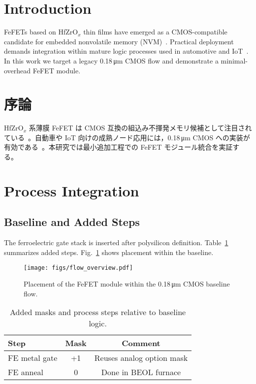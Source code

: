 \documentclass[journal]{IEEEtran}
\begin{document}
\section{Introduction}
FeFETs based on HfZrO$_x$ thin films have emerged as a CMOS-compatible candidate for embedded nonvolatile memory (NVM)~\citep{boscke2011hafnium,mueller2012fefet}. 
Practical deployment demands integration within mature logic processes used in automotive and IoT~\citep{mitsubishi2003automotive}. 
In this work we target a legacy 0.18\,\si{\micro\meter} CMOS flow and demonstrate a minimal-overhead FeFET module.

\section*{序論}
HfZrO$_x$ 系薄膜 FeFET は CMOS 互換の組込み不揮発メモリ候補として注目されている~\citep{boscke2011hafnium,mueller2012fefet}。自動車や IoT 向けの成熟ノード応用には，0.18\,\si{\micro\meter} CMOS への実装が有効である~\citep{mitsubishi2003automotive}。本研究では最小追加工程での FeFET モジュール統合を実証する。

\section{Process Integration}

\subsection*{Baseline and Added Steps}
The ferroelectric gate stack is inserted after polysilicon definition. 
Table~\ref{tab:masks} summarizes added steps. 
Fig.~\ref{fig:flow} shows placement within the baseline.

\begin{figure}[!t]
  \centering
  \texttt{[image: figs/flow\_overview.pdf]}
  \caption{Placement of the FeFET module within the 0.18\,\si{\micro\meter} CMOS baseline flow.}
  \label{fig:flow}
\end{figure}

\begin{table}[!t]
  \centering
  \caption{Added masks and process steps relative to baseline logic.}
  \label{tab:masks}
  \begin{tabular}{@{}lcc@{}}
    \toprule
    \textbf{Step} & \textbf{Mask} & \textbf{Comment}\\
    \midrule
    FE metal gate & +1 & Reuses analog option mask\\
    FE anneal     & 0  & Done in BEOL furnace\\
    \bottomrule
  \end{tabular}
\end{table}
\end{document}
